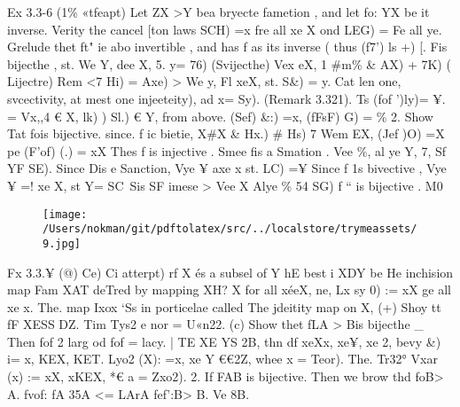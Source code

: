 \documentclass[a4paper,12pt]{article}
\begin{document}
\vspace{10pt}

\par

\vspace{10pt}

    Ex 3.3-6 (1\% «tfeapt)    Let ZX >Y bea bryecte fametion , and let fo: YX be it inverse.  Verity the cancel [ton laws    SCH) =x fre all xe X ond LEG) = Fe all ye.    Grelude thet ft" ie abo invertible , and has f as its inverse ( thus (f7') ls +)    [. Fis bijecthe , st. We Y, dee X, 5. y= 76) (Svijecthe)  Vex eX, 1 \#m\% \& AX) + 7K) ( Lijectre)  Rem <7 Hi) = Axe)  > We y, Fl xeX, st. S\&) = y. Cat len one, svcectivity, at mest one injeeteity),  ad x= Sy). (Remark 3.321).  Ts (fof ')ly)= ¥.    = Vx,,4 € X, lk) ) Sl.) € Y,  from above. (Sef) \&:) =x,  (fFsF) G) = \%    2. Show Tat fois bijective.    since. f ic bietie, X\#X \& Hx.) \# Hs) 7 Wem EX,  (Jef )O) =X pe  (F'of) (.) = xX Thes f is injective .    Smee fis a Smation . Vee \%, al ye Y,    7, Sf YF SE).  Since Dis e Sanction, Vye ¥ axe x st. LC) =¥    Since f 1s bivective , Vye ¥ =! xe X, st Y= SC\,    Sis SF imese > Vee X Alye \% 54 SG)    f “ is bijective . M0 

\vspace{10pt}

\par

\vspace{10pt}

\begin{figure}[h]

\texttt{[image: /Users/nokman/git/pdftolatex/src/../localstore/trymeassets/9.jpg]}

\centering

\end{figure}

\par

\vspace{10pt}

    Fx 3.3.¥ (@) Ce) Ci atterpt)  rf X és a subsel of Y hE best i XDY be He inchision map Fam XAT    deTred by mapping XH? X for all xéeX, ne, Lx sy 0) := xX ge all xe x.  The. map Ixox ‘Ss in porticelae called The jdeitity map on X,    (+) Shoy tt fF XESS DZ. Tim Tys2 e nor = U«n22.    (c) Show thet fLA > Bis bijecthe \_ Then fof 2 larg od  fof = lacy.    | TE XE YS 2B, thn df xeXx, xe¥, xe 2,  bevy \&) i= x, KEX, KET.  Lyo2 (X): =x, xe Y €€2Z, whee x = Teor).  The. Tr32° Vxar (x) := xX, xKEX, *€ a  = Zxo2).    2. If FAB is bijective. Then we brow thd foB> A.  fvof: fA 35A <= LArA  fef':B> B. Ve 8B. 
\end{document}
